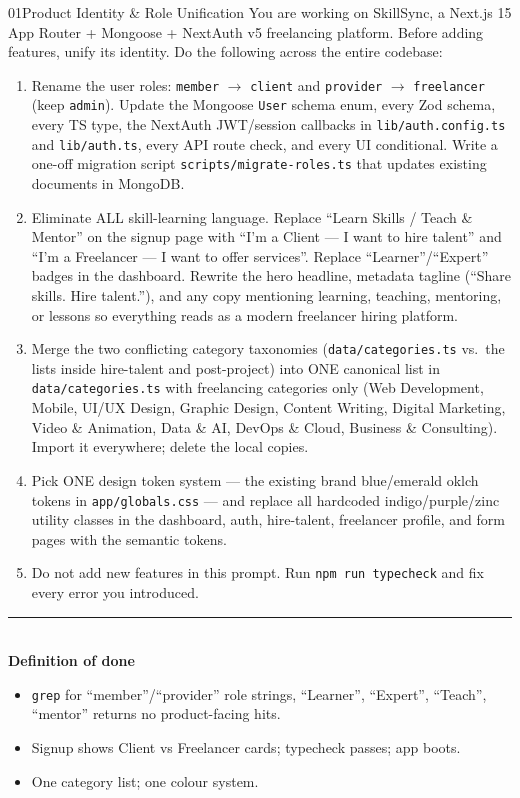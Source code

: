 \documentclass[11pt,a4paper]{article}
\newcommand{\dod}{\medskip\noindent\textcolor{donegreen}{\rule{\linewidth}{0.5pt}}\\[1mm]\textbf{\textcolor{donegreen}{Definition of done}}\\[-2mm]}
\newcommand{\filepath}[1]{\texttt{#1}}
\begin{document}
\begin{promptbox}{01}{Product Identity \& Role Unification}
You are working on SkillSync, a Next.js 15 App Router + Mongoose + NextAuth v5
freelancing platform. Before adding features, unify its identity. Do the following
across the entire codebase:

\begin{enumerate}[leftmargin=1.6em]
  \item Rename the user roles: \texttt{member} $\rightarrow$ \texttt{client} and
        \texttt{provider} $\rightarrow$ \texttt{freelancer} (keep \texttt{admin}).
        Update the Mongoose \texttt{User} schema enum, every Zod schema, every TS type,
        the NextAuth JWT/session callbacks in \filepath{lib/auth.config.ts} and
        \filepath{lib/auth.ts}, every API route check, and every UI conditional.
        Write a one-off migration script \filepath{scripts/migrate-roles.ts} that
        updates existing documents in MongoDB.
  \item Eliminate ALL skill-learning language. Replace ``Learn Skills / Teach \&
        Mentor'' on the signup page with ``I'm a Client --- I want to hire talent''
        and ``I'm a Freelancer --- I want to offer services''. Replace
        ``Learner''/``Expert'' badges in the dashboard. Rewrite the hero headline,
        metadata tagline (``Share skills. Hire talent.''), and any copy mentioning
        learning, teaching, mentoring, or lessons so everything reads as a modern
        freelancer hiring platform.
  \item Merge the two conflicting category taxonomies (\filepath{data/categories.ts}
        vs.\ the lists inside hire-talent and post-project) into ONE canonical list in
        \filepath{data/categories.ts} with freelancing categories only (Web
        Development, Mobile, UI/UX Design, Graphic Design, Content Writing, Digital
        Marketing, Video \& Animation, Data \& AI, DevOps \& Cloud, Business \&
        Consulting). Import it everywhere; delete the local copies.
  \item Pick ONE design token system --- the existing brand blue/emerald oklch tokens
        in \filepath{app/globals.css} --- and replace all hardcoded indigo/purple/zinc
        utility classes in the dashboard, auth, hire-talent, freelancer profile, and
        form pages with the semantic tokens.
  \item Do not add new features in this prompt. Run \texttt{npm run typecheck} and fix
        every error you introduced.
\end{enumerate}

\dod
\begin{itemize}[leftmargin=1.6em]
  \item \texttt{grep} for ``member''/``provider'' role strings, ``Learner'',
        ``Expert'', ``Teach'', ``mentor'' returns no product-facing hits.
  \item Signup shows Client vs Freelancer cards; typecheck passes; app boots.
  \item One category list; one colour system.
\end{itemize}
\end{promptbox}
\end{document}
